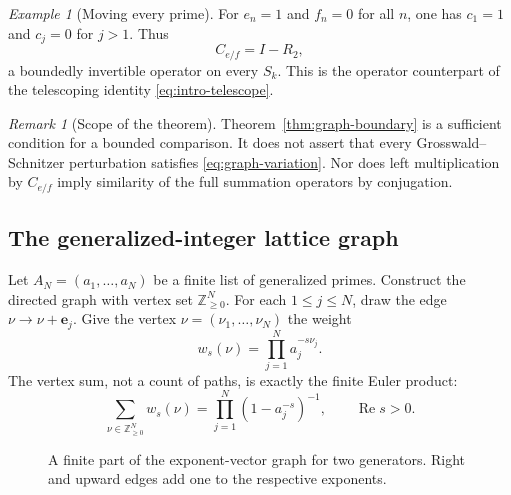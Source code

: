\documentclass[12pt,letterpaper]{article}
\theoremstyle{definition}
\theoremstyle{remark}
\newtheorem{remark}[theorem]{Remark}
\newtheorem{example}[theorem]{Example}
\numberwithin{equation}{section}
\newcommand{\Ree}{\operatorname{Re}}
\begin{document}
\begin{example}[Moving every prime]
For $e_n=1$ and $f_n=0$ for all $n$, one has $c_1=1$ and $c_j=0$
for $j>1$.  Thus
\[
  C_{e/f}=I-R_2,
\]
a boundedly invertible operator on every $S_k$.
This is the operator counterpart of the telescoping identity
\eqref{eq:intro-telescope}.
\end{example}

\begin{remark}[Scope of the theorem]
Theorem~\ref{thm:graph-boundary} is a sufficient condition for a
bounded comparison.  It does not assert that every Grosswald--Schnitzer
perturbation satisfies \eqref{eq:graph-variation}.  Nor does left
multiplication by $C_{e/f}$ imply similarity of the full summation
operators by conjugation.
\end{remark}

\subsection{The generalized-integer lattice graph}

Let $A_N=(a_1,\ldots,a_N)$ be a finite list of generalized primes.
Construct the directed graph with vertex set $\mathbb Z_{\ge0}^N$.
For each $1\le j\le N$, draw the edge
$\nu\to\nu+\mathbf e_j$.
Give the vertex $\nu=(\nu_1,\ldots,\nu_N)$ the weight
\[
  w_s(\nu)=\prod_{j=1}^N a_j^{-s\nu_j}.
\]
The vertex sum, not a count of paths, is exactly the finite Euler
product:
\begin{equation}\label{eq:graph-vertex-zeta}
  \sum_{\nu\in\mathbb Z_{\ge0}^N}w_s(\nu)
  =\prod_{j=1}^N(1-a_j^{-s})^{-1},\qquad \Ree s>0.
\end{equation}

\begin{figure}[htbp]
\centering
{}
\caption{A finite part of the exponent-vector graph for two generators.
Right and upward edges add one to the respective exponents.}
\label{fig:exponent-graph}
\end{figure}
\end{document}
